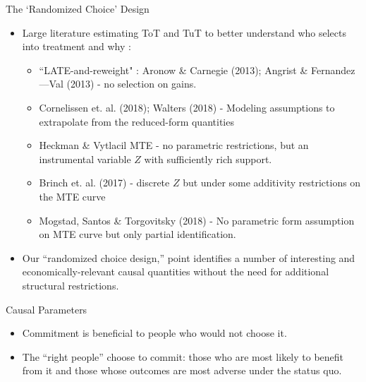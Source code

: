 \documentclass[8pt]{beamer}
\begin{document}
\begin{frame}{The `Randomized Choice' Design}
\label{rc_design}
\begin{itemize}
    \vfill \item  Large literature estimating ToT and TuT to better understand who selects  into  treatment  and  why : \begin{itemize}
        \item “LATE-and-reweight" : Aronow \& Carnegie (2013); Angrist \& Fernandez—Val (2013)  - no selection on gains.  
        \item Cornelissen et. al. (2018); Walters (2018)  - Modeling assumptions to extrapolate from the reduced-form quantities
        \item Heckman \& Vytlacil MTE - no parametric  restrictions,  but  an  instrumental  variable $Z$ with sufficiently rich support.
        \item Brinch et. al. (2017) - discrete $Z$ but under some additivity restrictions on the MTE curve
        \item Mogstad, Santos \& Torgovitsky (2018) - No parametric form assumption on MTE curve but only partial identification.
    \end{itemize}
    
    \vfill \item Our “randomized choice design,” point identifies a number of interesting and economically-relevant causal quantities  without  the  need  for  additional  structural  restrictions.  \hyperlink{identification_randomized_choice}{} %
    \hyperlink{choice_hte}{}
\end{itemize}
\end{frame}


\begin{frame}{Causal Parameters}
\begin{table}[H]
\caption{Causal TE}
\label{tot_tut}
\begin{center}
\scriptsize{}
\end{center}
\end{table}

\begin{itemize}
    \item Commitment is beneficial to people who would not choose it. 
    \item The “right people” choose to commit:  those who are most likely to benefit from it and those whose outcomes are most adverse under the status quo.
\end{itemize}
 
\end{frame}
\end{document}
